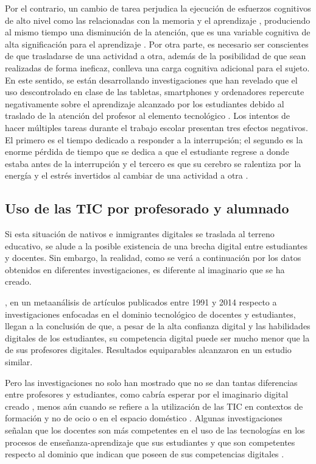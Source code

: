 \documentclass[spanish]{textolivre}
\begin{document}
Por el contrario, un cambio de tarea perjudica la ejecución de esfuerzos cognitivos de alto nivel como las relacionadas con la memoria y el aprendizaje \cite{kirschner_myths_2017, kutscher_ninos_2018}, produciendo al mismo tiempo una disminución de la atención, que es una variable cognitiva de alta significación para el aprendizaje \cite{goleman2013focus}. Por otra parte, es necesario ser conscientes de que trasladarse de una actividad a otra, además de la posibilidad de que sean realizadas de forma ineficaz, conlleva una carga cognitiva adicional para el sujeto. En este sentido, se están desarrollando investigaciones que han revelado que el uso descontrolado en clase de las tabletas, smartphones y ordenadores repercute negativamente sobre el aprendizaje alcanzado por los estudiantes debido al traslado de la atención del profesor al elemento tecnológico \cite{carter2017impact}. Los intentos de hacer múltiples tareas durante el trabajo escolar presentan tres efectos negativos. El primero es el tiempo dedicado a responder a la interrupción; el segundo es la enorme pérdida de tiempo que se dedica a que el estudiante regrese a donde estaba antes de la interrupción y el tercero es que su cerebro se ralentiza por la energía y el estrés invertidos al cambiar de una actividad a otra \cite{kutscher_ninos_2018}.


\subsection{Uso de las TIC por profesorado y alumnado}
Si esta situación de nativos e inmigrantes digitales se traslada al terreno educativo, se alude a la posible existencia de una brecha digital entre estudiantes y docentes. Sin embargo, la realidad, como se verá a continuación por los datos obtenidos en diferentes investigaciones, es diferente al imaginario que se ha creado.

\textcite{gallardo-echenique_lets_2015}, en un metaanálisis de artículos publicados entre 1991 y 2014 respecto a investigaciones enfocadas en el dominio tecnológico de docentes y estudiantes, llegan a la conclusión de que, a pesar de la alta confianza digital y las habilidades digitales de los estudiantes, su competencia digital puede ser mucho menor que la de sus profesores digitales. Resultados equiparables alcanzaron \textcite{recio2020analisis} en un estudio similar.

Pero las investigaciones no solo han mostrado que no se dan tantas diferencias entre profesores y estudiantes, como cabría esperar por el imaginario digital creado \cite{flores2013nativos}, menos aún cuando se refiere a la utilización de las TIC en contextos de formación y no de ocio o en el espacio doméstico \cite{wang2014investigation}. Algunas investigaciones señalan que los docentes son más competentes en el uso de las tecnologías en los procesos de enseñanza-aprendizaje que sus estudiantes \cite{wang2014investigation} y que son competentes respecto al dominio que indican que poseen de sus competencias digitales \cite{perez-escoda_competencia_2021}.
\end{document}
